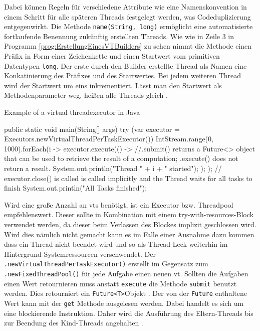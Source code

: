     Dabei können Regeln für verschiedene Attribute wie eine Namenskonvention
    in einem Schritt für alle späteren Threads festgelegt werden, was Codeduplizierung entgegenwirkt.
    Die Methode \texttt{name(String, long)} ermöglicht eine automatisierte fortlaufende Benennung zukünftig erstellten Threads. Wie wie in Zeile 3 in Programm 
    \ref{prog:ErstellungEinesVTBuilders} zu sehen nimmt die Methode einen Präfix in Form einer Zeichenkette und einen Startwert vom primitiven
    Datentypen \texttt{long}. Der erste durch den Builder erstellte Thread als Namen eine Konkatinierung des Präfixes und des Startwertes. Bei jedem weiteren Thread wird der Startwert um eins inkrementiert. Lässt man den Startwert als Methodenparameter weg, heißen alle Threads gleich 
    \cite{oracle22Builder}. 

    \begin{program} [H]
        \caption{Example of a virtual threadexecutor in Java}
        \label{prog:ErstellungEinesExecutors}
    \begin{JavaCode}[language=Java, numbers=left]
public static void main(String[] args) {
    try (var executor = Executors.newVirtualThreadPerTaskExecutor()){
        IntStream.range(0, 1000).forEach(i -> {
            executor.execute(() -> {     //.submit() returns a Future<> object that can be used to retrieve the result of a computation; .execute() does not return a result.
                System.out.println("Thread " + i + " started");
            });
        });
    }       // executor.close() is called is called implicitly and the Thread waits for all tasks to finish
    System.out.println("All Tasks finished"); 
}\end{JavaCode}
    \end{program}

    Wird eine große Anzahl an \Glspl{vt} benötigt,  ist ein Executor bzw. Threadpool empfehlenswert. Dieser sollte in Kombination mit einem
    try-with-resources-Block verwendet werden, da dieser beim Verlassen des Blockes implizit geschlossen wird. Wird dies nämlich nicht gemacht kann es
    im Falle einer Ausnahme dazu kommen dass ein Thread nicht beendet wird und so als Thread-Leck weiterhin im Hintergrund Systemressourcen verschwendet.
    Der \texttt{.newVirtualThreadPerTaskExecutor()}
    erstellt im Gegensatz zum \texttt{.newFixedThreadPool()} für jede Aufgabe einen neuen \gls{vt}.
    Sollten die Aufgaben einen Wert retournieren muss anstatt \texttt{execute} die Methode \texttt{submit} benutzt werden. Dies retourniert ein \texttt{Future<T>}Objekt 
    \cite{oracle21VritualThreads}.
    Der von der \texttt{Future} enthaltene Wert kann mit der
    \texttt{get}  Methode ausgelesen werden. Dabei handelt es sich um eine blockierende Instruktion. Daher wird die Ausführung des Eltern-Threads bis zur
    Beendung des Kind-Threads angehalten \cite{oracle21Future}.
    


